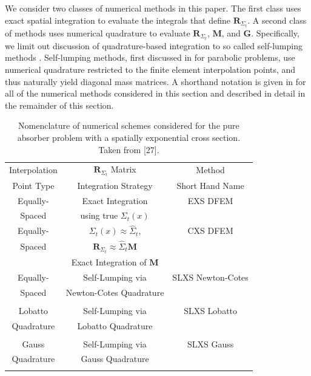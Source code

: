 We consider two classes of numerical methods in this paper.
The first class uses exact spatial integration to evaluate the integrals that define $\mathbf{R}_{\Sigma_t}$.
A second class of methods uses numerical quadrature to evaluate $\mathbf{R}_{\Sigma_t}$, $\mathbf{M}$, and $\mathbf{G}$.  
Specifically, we limit out discussion of quadrature-based integration to so called self-lumping methods \cite{part_1_paper}.  
Self-lumping methods, first discussed in \cite{raviart, thomee} for parabolic problems, use numerical quadrature restricted to the finite element interpolation points, and thus naturally yield diagonal mass matrices.  
A shorthand notation is given in  for all of the numerical methods considered in this section and described in detail in the remainder of this section.
\begin{table}[!htp]
\centering
\caption{Nomenclature of numerical schemes considered for the pure absorber problem with a spatially exponential cross section.  Taken from [27]. }
\begin{tabular}{|c|c|c|} 
\hline
  Interpolation &   $\mathbf{R}_{\Sigma_t}$ Matrix				& 	Method					\\
  Point Type		&		Integration Strategy														& 	Short Hand Name \\
  \hline
  Equally-  & 		Exact	Integration																	& EXS DFEM \\
  Spaced   	&   using true $\Sigma_t(x)$											&             \\
  \hline
  Equally-  	& 	$\Sigma_t(x) \approx \widehat{\Sigma}_t $,																			& CXS DFEM \\
  Spaced   	&   $\mathbf{R}_{\Sigma_t} \approx \widehat{\Sigma}_t \mathbf{M}$	&             \\
										&		Exact	Integration	of $\mathbf{M}$   																									&							   \\
  \hline
  Equally-  				& Self-Lumping via  												& SLXS Newton-Cotes	 \\
  Spaced   				& Newton-Cotes Quadrature					&																				\\
  {}											&			{} 																							&     																 \\
  \hline
    Lobatto  			& 	Self-Lumping via 		& 	 	SLXS Lobatto \\
  Quadrature 	& Lobatto Quadrature	&	   \\
    {}														&		{}										& 	      \\
  \hline
  Gauss  					& Self-Lumping via  			 	& SLXS Gauss \\
  Quadrature 	& Gauss Quadrature			& 				\\
    {}									&	{}										 								&      \\
  \hline
\end{tabular}
\label{tbl:names_chap3} 
\end{table}

